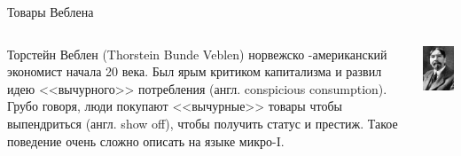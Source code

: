 \documentclass{beamer}
\begin{document}
\begin{frame}{Товары Веблена}
\begin{columns}
\begin{column}{0.5\textwidth}
   \alert{Торстейн Веблен} (Thorstein Bunde Veblen) норвежско -американский экономист начала 20 века. Был ярым критиком капитализма и развил идею <<вычурного>> потребления (англ. \alert{conspicious consumption}). Грубо говоря, люди покупают <<вычурные>> товары чтобы выпендриться (англ. show off), чтобы получить статус и престиж. \alert{Такое поведение очень сложно описать на языке микро-I.}
\end{column}
\begin{column}{0.5\textwidth}  %
    \begin{center}
     \includegraphics[width=1\textwidth]{veblen}
     \end{center}
\end{column}
\end{columns}
\end{frame}
\end{document}
